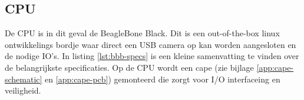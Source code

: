 \subsection{CPU}

De CPU is in dit geval de BeagleBone Black. Dit is een out-of-the-box linux ontwikkelings
bordje waar direct een USB camera op kan worden aangesloten en de nodige IO's. In listing 
\ref{lst:bbb-specs} is een kleine samenvatting te vinden over de belangrijkste 
specificaties. Op de CPU wordt een cape (zie bijlage \ref{app:cape-schematic} en \ref{app:cape-pcb}) 
gemonteerd die zorgt voor I/O interfaceing en veiligheid.

